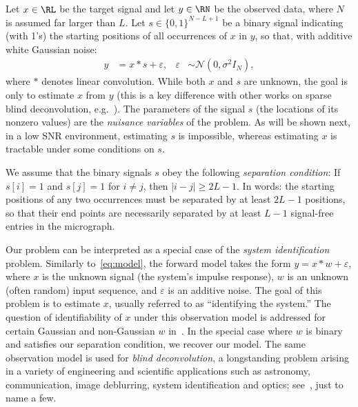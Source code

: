 \documentclass[9pt,twocolumn,twoside,lineno]{pnas-new}
\begin{document}
Let $x\in\RL$ be the target signal and let $y\in\RN$ be the observed data, where $N$ is assumed far larger than $L$. Let  $s \in \{0, 1\}^{N-L+1}$ be a binary signal indicating (with 1's) the starting positions of all occurrences of $x$ in $y$, so that, with additive white Gaussian noise:
\begin{align}
y & =  x \ast s + \varepsilon, & \varepsilon & \sim \mathcal{N}(0,\sigma^2 I_N),
\label{eq:model}
\end{align}
where $\ast$ denotes linear convolution. 
While both $x$ and $s$ are unknown, the goal is only to estimate $x$ from $y$ (this is a key difference with other works on sparse blind deconvolution, e.g.~\cite{zhang2018structured}). The parameters of the signal $s$ (the locations of its nonzero values) are the \emph{nuisance variables} of the problem. As will be shown next, in a low SNR environment, estimating $s$ is impossible, whereas estimating $x$ is tractable under some conditions on $s$. 

We assume that the binary signals $s$ obey the following \emph{separation condition}: If $s[i] = 1$ and $s[j] = 1$  for  $i \neq j$, then $\vert i - j\vert \geq 2L-1$.
In words: the starting positions of any two occurrences  must be separated by at least $2L-1$ positions, so that their end points are necessarily separated by at least $L-1$ signal-free entries in the micrograph.

Our problem can be interpreted as a special case of the \emph{system identification} problem. Similarly to~\eqref{eq:model}, the
forward model takes the form
%
\begin{math}
%
y = x\ast w + \varepsilon,  
%
\end{math} 
%
where $x$ is the unknown signal (the system's impulse response), $w$ is an unknown (often random) input sequence, and $\varepsilon$ is an additive noise.
The goal of this problem is to estimate $x$, usually referred to as ``identifying the system.'' The question of identifiability of $x$ under this observation model is addressed for certain Gaussian and non-Gaussian $w$ in~\cite{benveniste1980robust,kormylo1983identifiability}. In the special case where $w$ is binary and satisfies our separation condition, we recover our model. The same observation model is used for \emph{blind deconvolution}, a longstanding problem arising in a variety of engineering and scientific applications such as astronomy, communication, image deblurring, system identification and optics; see~\cite{jefferies1993restoration,shalvi1990new,ayers1988iterative,abed1997blind}, just to name a few. 
\end{document}
